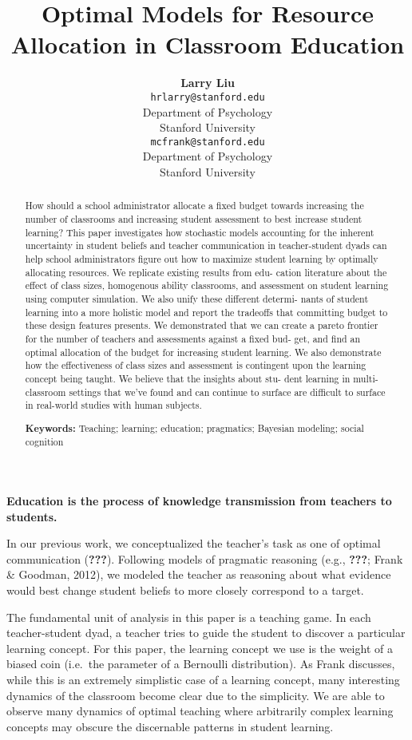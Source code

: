 \documentclass[10pt, letterpaper]{article}
\title{Optimal Models for Resource Allocation in Classroom Education}
\author{{\large \bf Larry Liu} \\ \texttt{hrlarry@stanford.edu} \\ Department of Psychology \\ Stanford University \And {\large \bf Michael C. Frank} \\ \texttt{mcfrank@stanford.edu} \\ Department of Psychology \\ Stanford University}
\begin{document}
\maketitle

\begin{abstract}
How should a school administrator allocate a fixed budget towards
increasing the number of classrooms and increasing student assessment to
best increase student learning? This paper investigates how stochastic
models accounting for the inherent uncertainty in student beliefs and
teacher communication in teacher-student dyads can help school
administrators figure out how to maximize student learning by optimally
allocating resources. We replicate existing results from edu- cation
literature about the effect of class sizes, homogenous ability
classrooms, and assessment on student learning using computer
simulation. We also unify these different determi- nants of student
learning into a more holistic model and report the tradeoffs that
committing budget to these design features presents. We demonstrated
that we can create a pareto frontier for the number of teachers and
assessments against a fixed bud- get, and find an optimal allocation of
the budget for increasing student learning. We also demonstrate how the
effectiveness of class sizes and assessment is contingent upon the
learning concept being taught. We believe that the insights about stu-
dent learning in multi-classroom settings that we've found and can
continue to surface are difficult to surface in real-world studies with
human subjects.

\textbf{Keywords:}
Teaching; learning; education; pragmatics; Bayesian modeling; social
cognition
\end{abstract}

\textbf{Education is the process of knowledge transmission from teachers
to students.}

In our previous work, we conceptualized the teacher's task as one of
optimal communication ({\textbf{???}}). Following models of pragmatic
reasoning (e.g., {\textbf{???}}; Frank \& Goodman, 2012), we modeled the
teacher as reasoning about what evidence would best change student
beliefs to more closely correspond to a target.

The fundamental unit of analysis in this paper is a teaching game. In
each teacher-student dyad, a teacher tries to guide the student to
discover a particular learning concept. For this paper, the learning
concept we use is the weight of a biased coin (i.e.~the parameter of a
Bernoulli distribution). As Frank discusses, while this is an extremely
simplistic case of a learning concept, many interesting dynamics of the
classroom become clear due to the simplicity. We are able to observe
many dynamics of optimal teaching where arbitrarily complex learning
concepts may obscure the discernable patterns in student learning.
\end{document}
